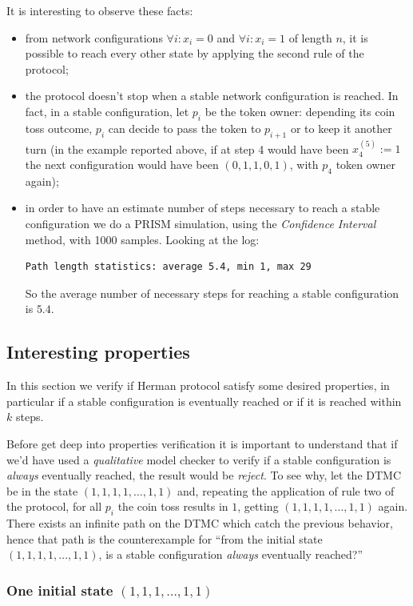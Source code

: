 It is interesting to observe these facts:
\begin{itemize}
\item from network configurations $\forall i:x_i=0$ and $\forall
  i:x_i=1$ of length $n$, it is possible to reach every other state by
  applying the second rule of the protocol;
\item the protocol doesn't stop when a stable network configuration is
  reached. In fact, in a stable configuration, let $p_i$ be the token
  owner: depending its coin toss outcome, $p_i$ can decide to pass the
  token to $p_{i+1}$ or to keep it another turn (in the example
  reported above, if at step 4 would have been $x_4^{(5)}:= 1$ the
  next configuration would have been $(0, 1, 1, 0, 1)$, with $p_4$
  token owner again);
\item in order to have an estimate number of steps necessary to reach
  a stable configuration we do a PRISM simulation, using the
  \emph{Confidence Interval} method, with 1000 samples. Looking at the
  log:
\begin{verbatim}
Path length statistics: average 5.4, min 1, max 29
\end{verbatim}
  So the average number of necessary steps for reaching a stable
  configuration is $5.4$.
\end{itemize}

\subsection{Interesting properties}

In this section we verify if Herman protocol satisfy some desired
properties, in particular if a stable configuration is eventually
reached or if it is reached within $k$ steps.

Before get deep into properties verification it is important to
understand that if we'd have used a \emph{qualitative} model checker
to verify if a stable configuration is \emph{always} eventually
reached, the result would be \emph{reject}. To see why, let the DTMC
be in the state $(1,1,1,1,\ldots,1,1)$ and, repeating the application
of rule two of the protocol, for all $p_i$ the coin toss results in
$1$, getting $(1,1,1,1,\ldots,1,1)$ again. There exists an infinite
path on the DTMC which catch the previous behavior, hence that path is
the counterexample for ``from the initial state
$(1,1,1,1,\ldots,1,1)$, is a stable configuration \emph{always}
eventually reached?''

\subsubsection{One initial state $(1,1,1,\ldots,1,1)$}

